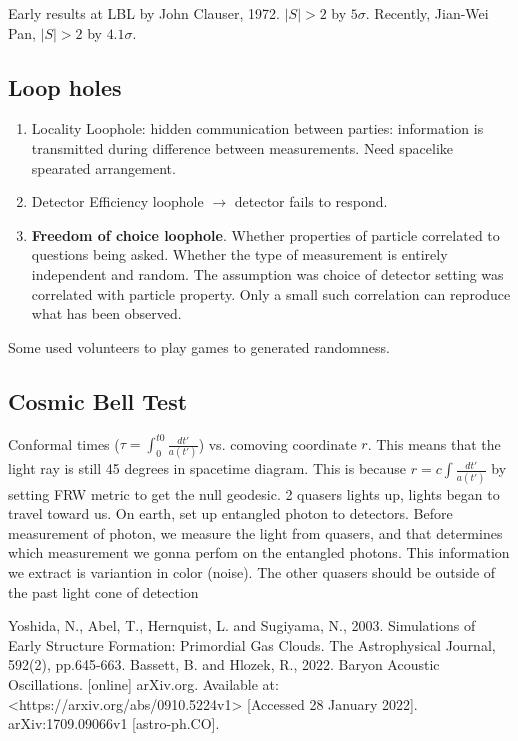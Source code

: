 \documentclass[11pt]{article}
\begin{document}
Early results at LBL by John Clauser, 1972. $|S|>2$ by $5\sigma$. Recently, Jian-Wei Pan, $|S|>2$ by $4.1\sigma$. 

\subsection*{Loop holes}
\begin{enumerate}
    \item Locality Loophole: hidden communication between parties: information is transmitted during difference between measurements. Need spacelike spearated arrangement. 
    \item Detector Efficiency loophole $\to$ detector fails to respond. 
    \item \textbf{Freedom of choice loophole}. Whether properties of particle correlated to questions being asked. Whether the type of measurement is entirely independent and random. The assumption was choice of detector setting was correlated with particle property. 
    Only a small such correlation can reproduce what has been observed. 
\end{enumerate}

Some used volunteers to play games to generated randomness. 

\subsection*{Cosmic Bell Test}
Conformal times ($\tau = \int^{t0}_0 \frac{dt'}{a(t')}$) vs. comoving coordinate $r$. This means that the light ray is still 45 degrees in spacetime diagram. This is because $r = c\int \frac{dt'}{a(t')}$ by setting FRW metric to get the null geodesic. 
2 quasers lights up, lights began to travel toward us. On earth, set up entangled photon to detectors. Before measurement of photon, we measure the light from quasers, and that determines which measurement we gonna perfom on the entangled photons. This information we extract is variantion in color (noise). 
The other quasers should be outside of the past light cone of detection

\begin{thebibliography}{999}
Yoshida, N., Abel, T., Hernquist, L. and Sugiyama, N., 2003. Simulations of Early Structure Formation: Primordial Gas Clouds. The Astrophysical Journal, 592(2), pp.645-663.
Bassett, B. and Hlozek, R., 2022. Baryon Acoustic Oscillations. [online] arXiv.org. Available at: <https://arxiv.org/abs/0910.5224v1> [Accessed 28 January 2022].
arXiv:1709.09066v1 [astro-ph.CO].
\end{thebibliography}
\end{document}
